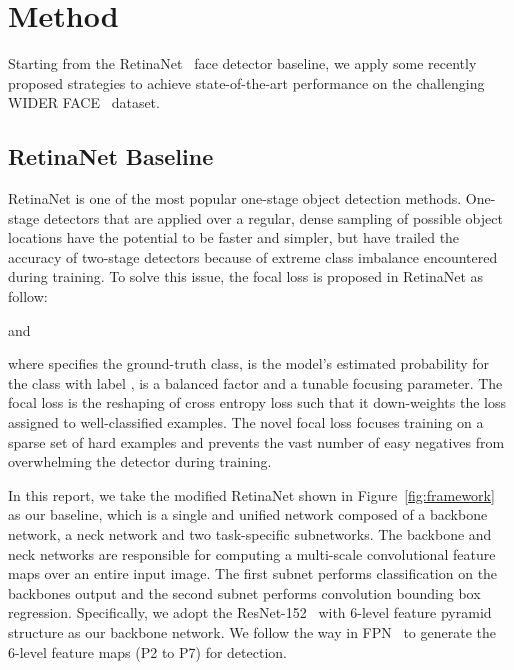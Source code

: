 \documentclass{article} \usepackage{nips13submit_e,times}
\begin{document}
\section{Method}
Starting from the RetinaNet~\cite{DBLP:conf/iccv/LinPRK17} face detector baseline, we apply some recently proposed strategies to achieve state-of-the-art performance on the challenging WIDER FACE~\cite{DBLP:conf/cvpr/YangLLT16} dataset.

\subsection{RetinaNet Baseline}
RetinaNet is one of the most popular one-stage object detection methods. One-stage detectors that are applied over a regular, dense sampling of possible object locations have the potential to be faster and simpler, but have trailed the accuracy of two-stage detectors because of extreme class imbalance encountered during training. To solve this issue, the focal loss is proposed in RetinaNet as follow:

and

where  specifies the ground-truth class,  is the model's estimated probability for the class with label ,  is a balanced factor and  a tunable focusing parameter. The focal loss is the reshaping of cross entropy loss such that it down-weights the loss assigned to well-classified examples. The novel focal loss focuses training on a sparse set of hard examples and prevents the vast number of easy negatives from overwhelming the detector during training.

In this report, we take the modified RetinaNet shown in Figure~\ref{fig:framework} as our baseline, which is a single and unified network composed of a backbone network, a neck network and two task-specific subnetworks. The backbone and neck networks are responsible for computing a multi-scale convolutional feature maps over an entire input image. The first subnet performs classification on the backbones output and the second subnet performs convolution bounding box regression. Specifically, we adopt the ResNet-152~\cite{DBLP:conf/cvpr/HeZRS16} with 6-level feature pyramid structure as our backbone network. We follow the way in FPN~\cite{DBLP:conf/cvpr/LinDGHHB17} to generate the 6-level feature maps (P2 to P7) for detection.
\end{document}
